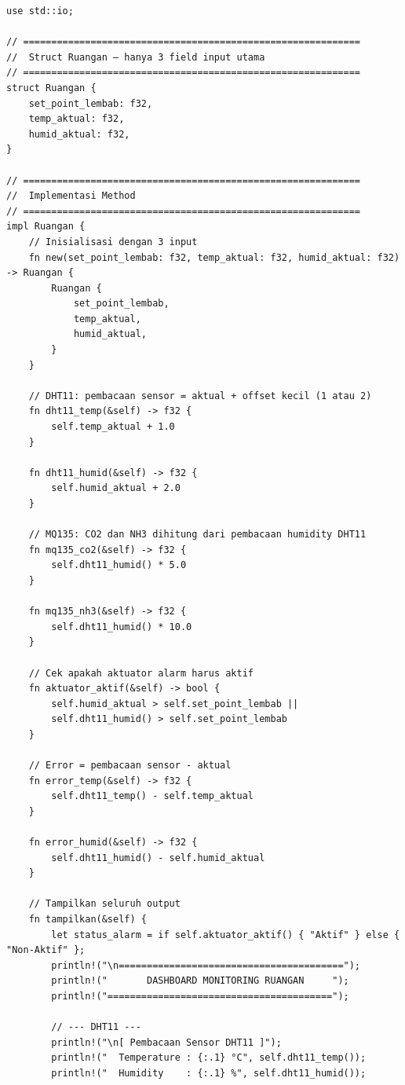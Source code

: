 \documentclass[12pt, a4paper]{article}
\begin{document}
\begin{lstlisting}
use std::io;

// ============================================================
//  Struct Ruangan — hanya 3 field input utama
// ============================================================
struct Ruangan {
    set_point_lembab: f32,
    temp_aktual: f32,
    humid_aktual: f32,
}

// ============================================================
//  Implementasi Method
// ============================================================
impl Ruangan {
    // Inisialisasi dengan 3 input
    fn new(set_point_lembab: f32, temp_aktual: f32, humid_aktual: f32) -> Ruangan {
        Ruangan {
            set_point_lembab,
            temp_aktual,
            humid_aktual,
        }
    }

    // DHT11: pembacaan sensor = aktual + offset kecil (1 atau 2)
    fn dht11_temp(&self) -> f32 {
        self.temp_aktual + 1.0
    }

    fn dht11_humid(&self) -> f32 {
        self.humid_aktual + 2.0
    }

    // MQ135: CO2 dan NH3 dihitung dari pembacaan humidity DHT11
    fn mq135_co2(&self) -> f32 {
        self.dht11_humid() * 5.0
    }

    fn mq135_nh3(&self) -> f32 {
        self.dht11_humid() * 10.0
    }

    // Cek apakah aktuator alarm harus aktif
    fn aktuator_aktif(&self) -> bool {
        self.humid_aktual > self.set_point_lembab ||
        self.dht11_humid() > self.set_point_lembab
    }

    // Error = pembacaan sensor - aktual
    fn error_temp(&self) -> f32 {
        self.dht11_temp() - self.temp_aktual
    }

    fn error_humid(&self) -> f32 {
        self.dht11_humid() - self.humid_aktual
    }

    // Tampilkan seluruh output
    fn tampilkan(&self) {
        let status_alarm = if self.aktuator_aktif() { "Aktif" } else { "Non-Aktif" };
        println!("\n========================================");
        println!("       DASHBOARD MONITORING RUANGAN     ");
        println!("========================================");
        
        // --- DHT11 ---
        println!("\n[ Pembacaan Sensor DHT11 ]");
        println!("  Temperature : {:.1} °C", self.dht11_temp());
        println!("  Humidity    : {:.1} %", self.dht11_humid());
        

\end{lstlisting}
\end{document}
